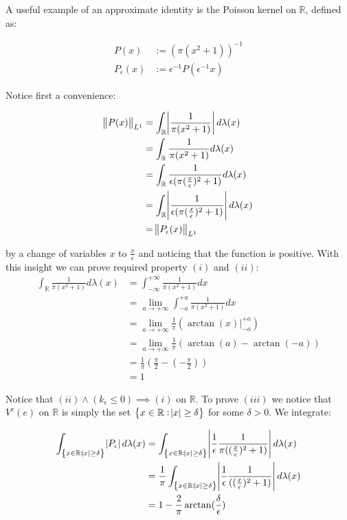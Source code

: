 \begin{example}

A useful example of an approximate identity is the Poisson kernel on $\mathbb{R}$, defined as:

\begin{align*}
P(x) &:= (\pi(x^2+1))^{-1} \\
P_\epsilon(x) &:= \epsilon^{-1}P(\epsilon^{-1}x)
\end{align*}

Notice first a convenience:

\begin{align*}
\norm{P(x)}_{L^1} &= \int_\mathbb{R} \abs{\frac{1}{ \pi (x^2+1)} } d\lambda(x) \\
&= \int_\mathbb{R} \frac{1}{ \pi (x^2+1)} d\lambda(x) \\
&= \int_\mathbb{R} \frac{1}{\epsilon(\pi (\frac{x}{\epsilon})^2+1)} d\lambda(x)\\
&= \int_\mathbb{R} \abs{ \frac{1}{\epsilon(\pi (\frac{x}{\epsilon})^2+1)}} d\lambda(x)\\
&= \norm{P_\epsilon(x)}_{L^1}
\end{align*}

by a change of variables $x$ to $\frac{x}{\epsilon}$ and noticing that the function is positive. With this insight we can prove required property $(i)$ and $(ii)$:
\begin{align*}
\int_\mathbb{R} \frac{1}{\pi(x^2+1)} d\lambda(x) &= \int_{-\infty}^{+\infty} \frac{1}{\pi(x^2+1)} dx \\
&= \lim_{a\to +\infty} \int_{-a}^{+a} \frac{1}{\pi(x^2+1)} dx \\
&= \lim_{a\to +\infty} \frac{1}{\pi}( \arctan(x) \vert_{-a}^{+a}) \\
&= \lim_{a\to +\infty} \frac{1}{\pi} (\arctan(a) - \arctan(-a)) \\
&= \frac{1}{\pi} (\frac{\pi}{2} - (- \frac{\pi}{2})) \\
&= 1
\end{align*}

Notice that $(ii) \wedge (k_\epsilon \leq 0) \implies (i)$ on $\mathbb{R}$. To prove $(iii)$ we notice that $V^c(e)$ on $\mathbb{R}$ is simply the set $\cbr{ x \in \mathbb{R} : \abs{x} \geq \delta}$ for some $\delta > 0$. We integrate:

\begin{align*}
\int_{\cbr{ x \in \mathbb{R} : \abs{x} \geq \delta}} \abs{P_\epsilon} d\lambda(x) &= \int_{\cbr{ x \in \mathbb{R} : \abs{x} \geq \delta}} \abs{\frac{1}{\epsilon}\frac{1}{\pi((\frac{x}{\epsilon})^2+1)}} d\lambda(x) \\
&= \frac{1}{\pi} \int_{\cbr{ x \in \mathbb{R} : \abs{x} \geq \delta}} \abs{\frac{1}{\epsilon}\frac{1}{((\frac{x}{\epsilon})^2+1)}} d\lambda(x)\\
&= 1 - \frac{2}{\pi} \arctan(\frac{\delta}{\epsilon})
\end{align*}


\end{example}
